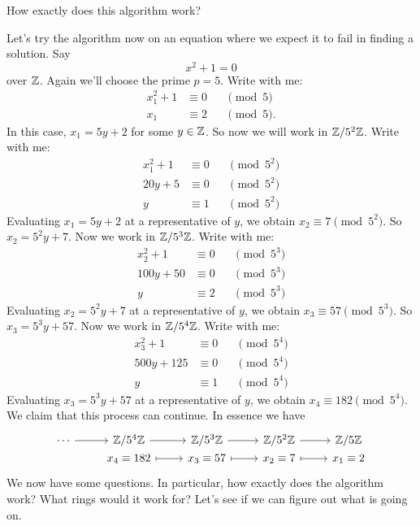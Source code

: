 \documentclass{ximera}
\begin{document}
\begin{question}
  How exactly does this algorithm work?
\end{question}

Let's try the algorithm now on an equation where we expect it to fail
in finding a solution. Say
\[
x^2 +  1 = 0
\]
over $\mathbb Z$. Again we'll choose the prime $p=5$. Write with me:
\begin{align*}
  x_1^2+1 &\equiv 0&&\pmod{5}\\
  x_1 &\equiv 2 &&\pmod{5}.
\end{align*}
In this case, $x_1 = 5y + 2$ for some $y\in \mathbb Z$. So now we will work
in $\mathbb Z/5^2\mathbb Z$. Write with me:
\begin{align*}
  x_1^2+1 &\equiv 0&&\pmod{5^2}\\
  20y+5 &\equiv 0 &&\pmod{5^2}\\
  y &\equiv 1 &&\pmod{5^2}
\end{align*}
Evaluating $x_1 = 5 y+2$ at a representative of $y$, we obtain $x_2
\equiv 7\pmod{5^2}$. So $x_2 = 5^2 y +7$. Now we work in
$\mathbb Z/5^3\mathbb Z$. Write with me:
\begin{align*}
  x_2^2+1 &\equiv 0&&\pmod{5^3}\\
  100y+50 &\equiv 0 &&\pmod{5^3}\\
  y &\equiv 2 &&\pmod{5^3}
\end{align*}
Evaluating $x_2 = 5^2 y+7$ at a representative of $y$, we obtain $x_3
\equiv 57\pmod{5^3}$. So $x_3 = 5^3 y +57$. Now we work in
$\mathbb Z/5^4\mathbb Z$. Write with me:
\begin{align*}
  x_3^2+1 &\equiv 0&&\pmod{5^4}\\
  500y+125 &\equiv 0 &&\pmod{5^4}\\
  y &\equiv 1 &&\pmod{5^4}
\end{align*}
Evaluating $x_3 = 5^3 y+57$ at a representative of $y$, we obtain $x_4
\equiv 182\pmod{5^4}$.  We claim that this process can continue. In
essence we have
\[
\begin{tikzcd}[row sep=0em,]
  \cdots \ar[r] & \Z/5^4\Z \ar[r] & \Z/5^3\Z \ar[r] & \Z/5^2\Z \ar[r] & \Z/5\Z \\
  & x_4\equiv 182 \ar[r,mapsto] & x_3\equiv 57 \ar[r,mapsto] & x_2\equiv 7 \ar[r,mapsto] &  x_1\equiv 2
\end{tikzcd}
\]
We now have some questions.  In particular, how exactly does the
algorithm work? What rings would it work for?  Let's see if we can
figure out what is going on.
\end{document}
